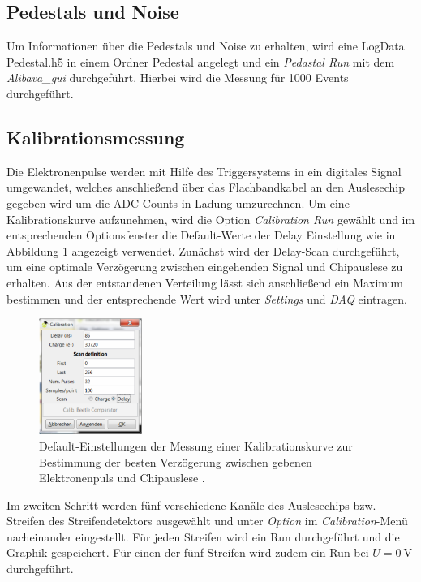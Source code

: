 \subsection{Pedestals und Noise}
\label{sec:Auswertung_Noise}
Um Informationen über die Pedestals und Noise zu erhalten, wird eine LogData Pedestal.h5 in einem Ordner Pedestal angelegt und ein \textit{Pedastal Run} mit dem \textit{Alibava\_gui} durchgeführt. Hierbei wird die Messung für 1000 Events durchgeführt.

\subsection{Kalibrationsmessung}
\label{sec:Kalibrationsmessung}
Die Elektronenpulse werden mit Hilfe des Triggersystems in ein digitales Signal umgewandet, welches anschließend über das Flachbandkabel an den Auslesechip gegeben wird um die ADC-Counts in Ladung umzurechnen. Um eine Kalibrationskurve aufzunehmen, wird die Option \textit{Calibration Run} gewählt und im entsprechenden Optionsfenster die Default-Werte der Delay Einstellung wie in Abbildung \ref{fig:calibration-durchfuehrung} angezeigt verwendet. Zunächst wird der Delay-Scan durchgeführt, um eine optimale Verzögerung zwischen eingehenden Signal und Chipauslese zu erhalten. Aus der entstandenen Verteilung lässt sich anschließend ein Maximum bestimmen und der entsprechende Wert wird unter \textit{Settings} und \textit{DAQ} eintragen.\\
\begin{figure}[htb]
  \centering
  \includegraphics[width=0.3\textwidth]{graphics/Calibration.pdf}
  \caption{Default-Einstellungen der Messung einer Kalibrationskurve zur Bestimmung
  der besten Verzögerung zwischen gebenen Elektronenpuls und Chipauslese \cite{anleitung}.}
  \label{fig:calibration-durchfuehrung}
\end{figure}

Im zweiten Schritt werden fünf verschiedene Kanäle des Auslesechips bzw. Streifen des Streifendetektors ausgewählt und unter \textit{Option} im \textit{Calibration}-Menü nacheinander eingestellt. Für jeden Streifen wird ein Run durchgeführt und die Graphik gespeichert. Für einen der fünf Streifen wird zudem ein Run bei $U=\SI{0}{\volt}$ durchgeführt.

